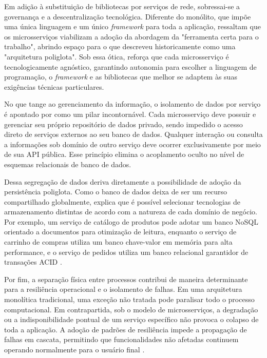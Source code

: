 Em adição à substituição de bibliotecas por serviços de rede, sobressai-se a governança e a descentralização tecnológica. Diferente do monólito, que impõe uma única linguagem e um único \textit{framework} para toda a aplicação,  ressaltam que os microsserviços viabilizam a adoção da abordagem da "ferramenta certa para o trabalho", abrindo espaço para o que  descreveu historicamente como uma "arquitetura poliglota". Sob essa ótica,  reforça que cada microsserviço é tecnologicamente agnóstico, garantindo autonomia para escolher a linguagem de programação, o \textit{framework} e as bibliotecas que melhor se adaptem às suas exigências técnicas particulares.

No que tange ao gerenciamento da informação, o isolamento de dados por serviço é apontado por  como um pilar incontornável. Cada microsserviço deve possuir e gerenciar seu próprio repositório de dados privado, sendo impedido o acesso direto de serviços externos ao seu banco de dados. Qualquer interação ou consulta a informações sob domínio de outro serviço deve ocorrer exclusivamente por meio de sua API pública. Esse princípio elimina o acoplamento oculto no nível de esquemas relacionais de banco de dados.

Dessa segregação de dados deriva diretamente a possibilidade de adoção da persistência poliglota. Como o banco de dados deixa de ser um recurso compartilhado globalmente,  explica que é possível selecionar tecnologias de armazenamento distintas de acordo com a natureza de cada domínio de negócio. Por exemplo, um serviço de catálogo de produtos pode adotar um banco NoSQL orientado a documentos para otimização de leitura, enquanto o serviço de carrinho de compras utiliza um banco chave-valor em memória para alta performance, e o serviço de pedidos utiliza um banco relacional garantidor de transações ACID \cite{richardson2018}.

Por fim, a separação física entre processos contribui de maneira determinante para a resiliência operacional e o isolamento de falhas. Em uma arquitetura monolítica tradicional, uma exceção não tratada pode paralisar todo o processo computacional. Em contrapartida, sob o modelo de microsserviços, a degradação ou a indisponibilidade pontual de um serviço específico não provoca o colapso de toda a aplicação. A adoção de padrões de resiliência impede a propagação de falhas em cascata, permitindo que funcionalidades não afetadas continuem operando normalmente para o usuário final \cite{newman2021}.

